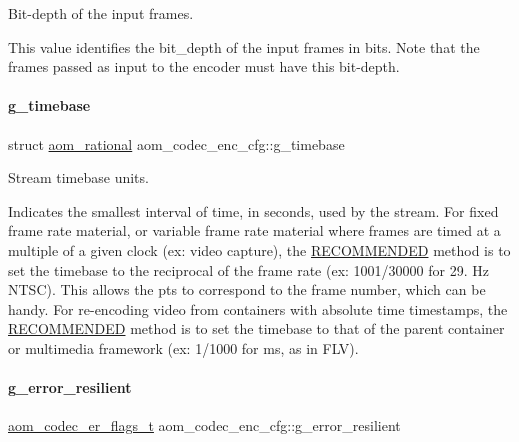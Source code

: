 Bit-\/depth of the input frames. 

This value identifies the bit\+\_\+depth of the input frames in bits. Note that the frames passed as input to the encoder must have this bit-\/depth. \mbox{\label{structaom__codec__enc__cfg_a10664f1fc5b6ec29b77ee13efeeecdf7}} 
\paragraph{\texorpdfstring{g\+\_\+timebase}{g\_timebase}}
{\footnotesize\ttfamily struct \hyperlink{structaom__rational}{aom\+\_\+rational} aom\+\_\+codec\+\_\+enc\+\_\+cfg\+::g\+\_\+timebase}



Stream timebase units. 

Indicates the smallest interval of time, in seconds, used by the stream. For fixed frame rate material, or variable frame rate material where frames are timed at a multiple of a given clock (ex\+: video capture), the \hyperlink{rfc2119_RECOMMENDED}{R\+E\+C\+O\+M\+M\+E\+N\+D\+ED} method is to set the timebase to the reciprocal of the frame rate (ex\+: 1001/30000 for 29. Hz N\+T\+SC). This allows the pts to correspond to the frame number, which can be handy. For re-\/encoding video from containers with absolute time timestamps, the \hyperlink{rfc2119_RECOMMENDED}{R\+E\+C\+O\+M\+M\+E\+N\+D\+ED} method is to set the timebase to that of the parent container or multimedia framework (ex\+: 1/1000 for ms, as in F\+LV). \mbox{\label{structaom__codec__enc__cfg_a8f3763485bb1f6eea6466b2fe0da2304}} 
\paragraph{\texorpdfstring{g\+\_\+error\+\_\+resilient}{g\_error\_resilient}}
{\footnotesize\ttfamily \hyperlink{group__encoder_ga5f326af84993f371bb165883bb5a5a59}{aom\+\_\+codec\+\_\+er\+\_\+flags\+\_\+t} aom\+\_\+codec\+\_\+enc\+\_\+cfg\+::g\+\_\+error\+\_\+resilient}



